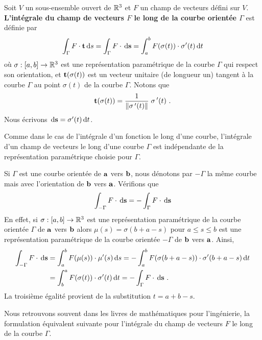 {\begin{focus}{\dfn}
Soit $V$ un sous-ensemble ouvert de $\mathbb{R}^3$ et $F$ un champ de
vecteurs défini sur $V$.
{\bfseries L'intégrale du champ de vecteurs $F$ le long de la
courbe orientée $\Gamma$} est définie par
\begin{equation} \label{line_int_vect}
\int_\Gamma F \cdot \mathbf{t} \,\mathrm{d}s = \int_\Gamma F \cdot \,\mathrm{d}\mathbf{s}
= \int_a^b F(\sigma(t)) \cdot \sigma'(t) \,\mathrm{d}t
\end{equation}
où $\sigma:[a,b] \to \mathbb{R}^3$ est une représentation paramétrique de la
courbe $\Gamma$ qui respect son orientation, et $\mathbf{t}(\sigma(t))$ est
un vecteur unitaire (de longueur un) tangent à la courbe $\Gamma$ au
point $\sigma(t)$ de la courbe $\Gamma$.  Notons que
\[
\mathbf{t}(\sigma(t)) = \frac{1}{\|\sigma\,'(t)\|}\;\sigma\,'(t) \ .
\]
Nous écrivons $\,\mathrm{d}\mathbf{s} = \sigma'(t) \,\mathrm{d}t$.
\end{focus}

\begin{rmk}
Comme dans le cas de l'intégrale d'un fonction le long d'une courbe, 
l'intégrale d'un champ de vecteurs le long d'une courbe $\Gamma$ est
indépendante de la représentation paramétrique choisie pour $\Gamma$.
\end{rmk}

\begin{rmk}
Si $\Gamma$ est une courbe orientée de $\mathbf{a}$ vers $\mathbf{b}$, nous
dénotons par $-\Gamma$ la même courbe mais avec l'orientation de
$\mathbf{b}$ vers $\mathbf{a}$.  Vérifions que
\[
  \int_{-\Gamma} F \cdot \,\mathrm{d}\mathbf{s}
= - \int_\Gamma F \cdot \,\mathrm{d}\mathbf{s}
\]
En effet, si $\sigma:[a,b]\to \mathbb{R}^3$ est une représentation
paramétrique de la courbe orientée $\Gamma$ de $\mathbf{a}$ vers
$\mathbf{b}$ alors $\mu(s) = \sigma(b+a-s)$ pour $a \leq s \leq b$
est une représentation paramétrique de la courbe orientée $-\Gamma$ de
$\mathbf{b}$ vers $\mathbf{a}$.  Ainsi,
\begin{align*}
\int_{-\Gamma} F \cdot \,\mathrm{d}\mathbf{s} &=
\int_a^b F(\mu(s)) \cdot \mu'(s) \,\mathrm{d}s
= - \int_a^b F(\sigma(b+a -s)) \cdot \sigma'(b+a-s) \,\mathrm{d}t \\
&= \int_b^a F(\sigma(t)) \cdot \sigma'(t) \,\mathrm{d}t
= - \int_\Gamma F \cdot \,\mathrm{d}\mathbf{s} \ .
\end{align*}
La troisième égalité provient de la substitution $t = a+b-s$.
\end{rmk}

Nous retrouvons souvent dans les livres de mathématiques pour
l'ingénierie, la formulation équivalent suivante pour l'intégrale du
champ de vecteurs $F$ le long de la courbe $\Gamma$.

}
